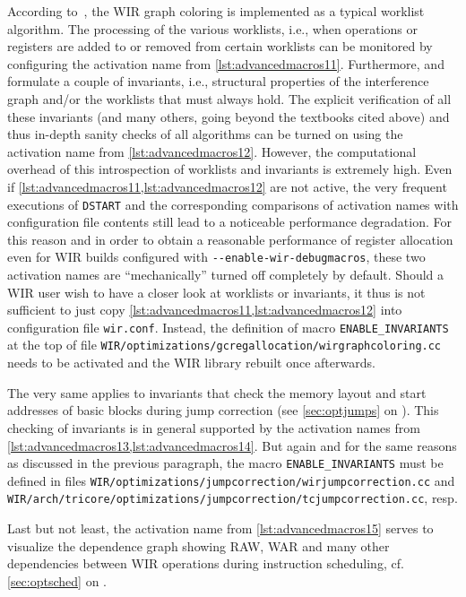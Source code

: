 According to~\cite[chapter~16.3]{Much97}, the \gls{WIR} graph coloring is implemented as a typical worklist algorithm.
The processing of the various worklists, i.e., when operations or registers are added to or removed from certain worklists can be monitored by configuring the activation name from \cref{lst:advancedmacros11}.
Furthermore, \cite[chapter~16.3]{Much97} and~\cite[chapter~11]{Appel04} formulate a couple of invariants, i.e., structural properties of the interference graph and/or the worklists that must always hold.
The explicit verification of all these invariants (and many others, going beyond the textbooks cited above) and thus in-depth sanity checks of all algorithms can be turned on using the activation name from \cref{lst:advancedmacros12}.
However, the computational overhead of this introspection of worklists and invariants is extremely high.
Even if \cref{lst:advancedmacros11,lst:advancedmacros12} are not active, the very frequent executions of \texttt{DSTART} and the corresponding comparisons of activation names with configuration file contents still lead to a noticeable performance degradation.
For this reason and in order to obtain a reasonable performance of register allocation even for \gls{WIR} builds configured with \texttt{-{}-enable-wir-debugmacros}, these two activation names are ``mechanically'' turned off completely by default.
Should a \gls{WIR} user wish to have a closer look at worklists or invariants, it thus is not sufficient to just copy \cref{lst:advancedmacros11,lst:advancedmacros12} into configuration file \texttt{wir.conf}.
Instead, the definition of macro \texttt{ENABLE\_INVARIANTS} at the top of file \texttt{WIR/optimizations/gcregallocation/wirgraphcoloring.cc} needs to be activated and the \gls{WIR} library rebuilt once afterwards.

The very same applies to invariants that check the memory layout and start addresses of basic blocks during jump correction (see \cref{sec:optjumps} on ).
This checking of invariants is in general supported by the activation names from \cref{lst:advancedmacros13,lst:advancedmacros14}.
But again and for the same reasons as discussed in the previous paragraph, the macro \texttt{ENABLE\_INVARIANTS} must be defined in files \texttt{WIR/optimizations/jumpcorrection/wirjumpcor\-rec\-tion.cc} and \texttt{WIR/arch/tricore/optimizations/jumpcorrection/tcjumpcorrection.cc}, resp.

Last but not least, the activation name from \cref{lst:advancedmacros15} serves to visualize the dependence graph showing \gls{RAW}, \gls{WAR} and many other dependencies between \gls{WIR} operations during instruction scheduling, cf. \cref{sec:optsched} on .


\cleardoubleoddpage
